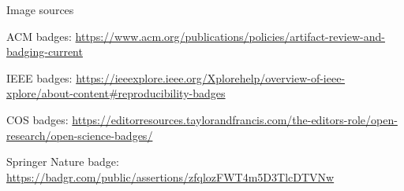 Image sources

ACM badges: \url{https://www.acm.org/publications/policies/artifact-review-and-badging-current}

IEEE badges: \url{https://ieeexplore.ieee.org/Xplorehelp/overview-of-ieee-xplore/about-content#reproducibility-badges}

COS badges: \url{https://editorresources.taylorandfrancis.com/the-editors-role/open-research/open-science-badges/}

Springer Nature badge: \url{https://badgr.com/public/assertions/zfqlozFWT4m5D3TlcDTVNw}